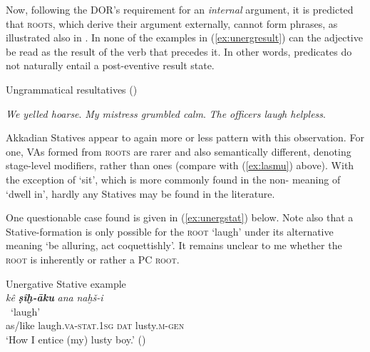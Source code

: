 \documentclass[output=paper,colorlinks,citecolor=brown]{langscibook}
\begin{document}
 Now, following the DOR's requirement for an \textit{internal} argument, it is predicted that  \textsc{roots}, which derive their argument externally, cannot form  phrases, as illustrated also in \cite[35f.]{LevinRappaport1995}. In none of the examples in (\ref{ex:unergresult}) can the adjective be read as the result of the verb that precedes it. In other words,  predicates do not naturally entail a post-eventive result state.

\begin{exe}  \ex Ungrammatical  resultatives (\citealt[36]{LevinRappaport1995})\label{ex:unergresult}
\begin{xlist}
    \ex    *\textit{We yelled hoarse}.
    \ex *\textit{My mistress grumbled calm}.
    \ex *\textit{The officers laugh helpless}.
\end{xlist}
\end{exe} 

 Akkadian Statives appear to again more or less pattern with this observation. For one, VAs formed from  \textsc{roots} are rarer and also semantically different, denoting  stage-level modifiers, rather than  ones (compare with (\ref{ex:lasmu}) above). With the exception of  `sit', which is more commonly found in the non-  meaning of `dwell in', hardly any  Statives may be found in the literature.

One questionable case found is given in (\ref{ex:unergstat}) below. Note also that a Stative-formation is only possible for the \textsc{root}  `laugh' under its alternative meaning `be alluring, act coquettishly'. It remains unclear to me whether the \textsc{root} is inherently  or rather a PC \textsc{root}. 

\begin{exe}
    \ex \label{ex:unergstat} Unergative  Stative example\\
    \glll \textit{kê} {\textit{\textbf{ṣîḫ-āku}} } \textit{ana} \textit{naḫš-i}\\
    {} ~`laugh' {} {} \\
     as/like laugh.\textsc{va-stat.1sg} \textsc{dat} lusty.\textsc{m-gen}\\
    \glt `How I entice (my) lusty boy.' ()
\end{exe}
\end{document}
